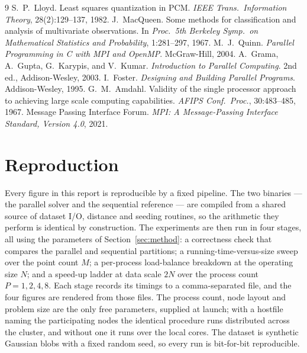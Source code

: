 \documentclass[11pt,a4paper]{article}
\begin{document}
\begin{thebibliography}{9}
 S.\ P.\ Lloyd. Least squares quantization in PCM.
\emph{IEEE Trans.\ Information Theory}, 28(2):129--137, 1982.
 J.\ MacQueen. Some methods for classification and
analysis of multivariate observations. In \emph{Proc.\ 5th Berkeley Symp.\ on
Mathematical Statistics and Probability}, 1:281--297, 1967.
 M.\ J.\ Quinn. \emph{Parallel Programming in C with MPI and
OpenMP}. McGraw-Hill, 2004.
 A.\ Grama, A.\ Gupta, G.\ Karypis, and V.\ Kumar.
\emph{Introduction to Parallel Computing}. 2nd ed., Addison-Wesley, 2003.
 I.\ Foster. \emph{Designing and Building Parallel
Programs}. Addison-Wesley, 1995.
 G.\ M.\ Amdahl. Validity of the single processor approach
to achieving large scale computing capabilities. \emph{AFIPS Conf.\ Proc.},
30:483--485, 1967.
 Message Passing Interface Forum. \emph{MPI: A Message-Passing
Interface Standard, Version 4.0}, 2021.
\end{thebibliography}

\appendix
\section{Reproduction}
\label{app:repro}

Every figure in this report is reproducible by a fixed pipeline. The two
binaries --- the parallel solver and the sequential reference --- are compiled from
a shared source of dataset I/O, distance and seeding routines, so the arithmetic
they perform is identical by construction. The experiments are then run in four
stages, all using the parameters of Section~\ref{sec:method}: a correctness check
that compares the parallel and sequential partitions; a running-time-versus-size
sweep over the point count $M$; a per-process load-balance breakdown at the
operating size $N$; and a speed-up ladder at data scale $2N$ over the process
count $P=1,2,4,8$. Each stage records its timings to a comma-separated file, and
the four figures are rendered from those files. The process count, node layout
and problem size are the only free parameters, supplied at launch; with a
hostfile naming the participating nodes the identical procedure runs distributed
across the cluster, and without one it runs over the local cores. The dataset is
synthetic Gaussian blobs with a fixed random seed, so every run is bit-for-bit
reproducible.
\end{document}
